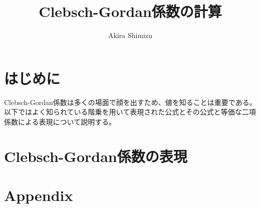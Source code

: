 \documentclass[dvipdfmx]{jsarticle}
\begin{document}
\title{Clebsch-Gordan係数の計算}
\author{Akira Shimizu}
\thispagestyle{empty}
\maketitle

\tableofcontents
\clearpage

\section{はじめに}

Clebsch-Gordan係数は多くの場面で顔を出すため、値を知ることは重要である。
以下ではよく知られている階乗を用いて表現された公式とその公式と等価な二項係数による表現について説明する。

\section{Clebsch-Gordan係数の表現}



\newpage


\newpage
\section{Appendix}

\end{document}
